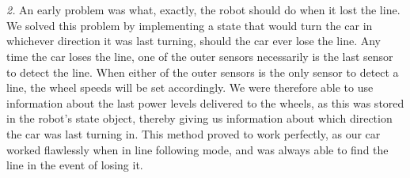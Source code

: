 \documentclass[paper=a4, fontsize=11pt]{scrartcl}
\numberwithin{equation}{section}		%
\numberwithin{figure}{section}			%
\numberwithin{table}{section}				%
\begin{document}
{\\\\
\textit{2. }An early problem was what, exactly, the robot should do when it lost the line. We solved this problem by implementing a state that would turn the car in whichever direction it was last turning, should the car ever lose the line. Any time the car loses the line, one of the outer sensors necessarily is the last sensor to detect the line. When either of the outer sensors is the only sensor to detect a line, the wheel speeds will be set accordingly. We were therefore able to use information about the last power levels delivered to the wheels, as this was stored in the robot's state object, thereby giving us information about which direction the car was last turning in. This method proved to work perfectly, as our car worked flawlessly when in line following mode, and was always able to find the line in the event of losing it.



}
\end{document}
